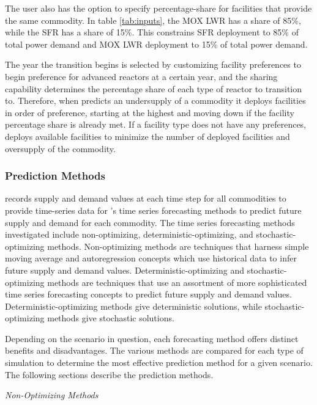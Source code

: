     The user also has the option to specify percentage-share for facilities 
    that provide the same commodity.   
    In table \ref{tab:inputs}, 
    the \gls{MOX} \gls{LWR} has a share of 85\%, while 
    the \gls{SFR} has a share of 15\%. 
    This constrains \gls{SFR} deployment to 85\% of total power demand 
    and \gls{MOX} \gls{LWR} deployment to 15\% of total power demand.  

    The year the transition begins is selected by customizing facility 
    preferences to begin preference for advanced reactors at a certain year,
    and the sharing capability determines the percentage 
    share of each type of reactor to transition to. 
    Therefore, when \deploy predicts an undersupply of a commodity 
    it deploys facilities in order of preference, starting at 
    the highest and moving down if the facility percentage share 
    is already met. 
    If a facility type does not have any preferences, \deploy 
    deploys available facilities to minimize the number of deployed 
    facilities and oversupply of the commodity.

\subsubsection{\textbf{Prediction Methods}}
\deploy records supply and demand values at each time step for all 
commodities to provide time-series data for \deploy's time series 
forecasting methods to predict future supply and demand for each 
commodity.  
The time series forecasting methods investigated include non-optimizing, 
deterministic-optimizing, and stochastic-optimizing methods. 
Non-optimizing methods are techniques that harness 
simple moving average and autoregression concepts which use 
historical data to infer future supply and demand values. 
Deterministic-optimizing and stochastic-optimizing 
methods are techniques 
that use an assortment of more sophisticated time series forecasting 
concepts to predict future supply and demand values. 
Deterministic-optimizing methods give deterministic solutions,
while stochastic-optimizing methods give stochastic solutions. 

Depending on the scenario in question, each forecasting method 
offers distinct benefits and disadvantages.
The various methods are compared for each type of simulation 
to determine the most effective prediction method for 
a given scenario. 
The following sections describe the prediction methods. 

\noindent
\textit{Non-Optimizing Methods}

